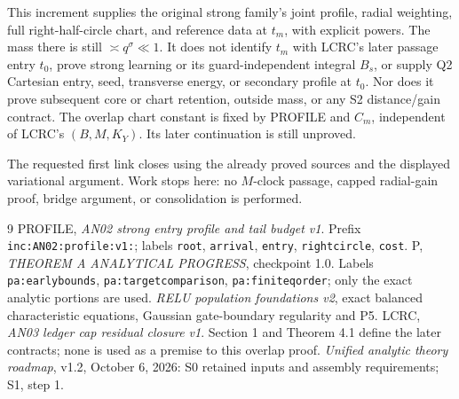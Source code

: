 \documentclass[11pt]{article}
\theoremstyle{remark}\newtheorem{remark}[theorem]{Remark}
\begin{document}
This increment supplies the original strong family's joint profile,
radial weighting, full right-half-circle chart, and reference data
at $t_m$, with explicit powers. The mass there is still
$\asymp q^\sigma\ll1$. It does not identify $t_m$ with LCRC's later
passage entry $t_0$, prove strong learning or its guard-independent
integral $B_s$, or supply Q2 Cartesian entry, seed, transverse energy,
or secondary profile at $t_0$. Nor does it prove subsequent core or
chart retention, outside mass, or any S2 distance/gain contract.
The overlap chart constant is fixed by PROFILE and $C_m$, independent
of LCRC's $(B,M,K_Y)$. Its later continuation is still unproved.

The requested first link closes using the already proved sources
and the displayed variational argument. Work stops here: no
$M$-clock passage, capped radial-gain proof, bridge argument, or
consolidation is performed.

\begin{thebibliography}{9}\small
{} PROFILE,
\emph{AN02 strong entry profile and tail budget v1}.
Prefix \texttt{inc:AN02:profile:v1:}; labels \texttt{root},
\texttt{arrival}, \texttt{entry}, \texttt{rightcircle}, \texttt{cost}.
 P, \emph{THEOREM A ANALYTICAL PROGRESS}, checkpoint 1.0.
Labels \texttt{pa:earlybounds}, \texttt{pa:targetcomparison},
\texttt{pa:finiteqorder}; only the exact analytic portions are used.
 \emph{RELU population foundations v2}, exact balanced
characteristic equations, Gaussian gate-boundary regularity and P5.
 LCRC, \emph{AN03 ledger cap residual closure v1}.
Section 1 and Theorem 4.1 define the later contracts; none is used
as a premise to this overlap proof.
 \emph{Unified analytic theory roadmap}, v1.2,
October 6, 2026: S0 retained inputs and assembly requirements;
S1, step 1.
\end{thebibliography}
\end{document}
